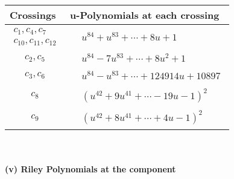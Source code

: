 \documentclass[1p]{elsarticle_modified}
\theoremstyle{definition}
\begin{document}
\begin{tabular}{m{50pt}|m{274pt}}
Crossings & \hspace{64pt}u-Polynomials at each crossing \\
\hline $$\begin{aligned}c_{1},c_{4},c_{7}\\c_{10},c_{11},c_{12}\end{aligned}$$&$\begin{aligned}
&u^{84}+u^{83}+\cdots+8 u+1
\end{aligned}$\\
\hline $$\begin{aligned}c_{2},c_{5}\end{aligned}$$&$\begin{aligned}
&u^{84}-7 u^{83}+\cdots+8 u^2+1
\end{aligned}$\\
\hline $$\begin{aligned}c_{3},c_{6}\end{aligned}$$&$\begin{aligned}
&u^{84}- u^{83}+\cdots+124914 u+10897
\end{aligned}$\\
\hline $$\begin{aligned}c_{8}\end{aligned}$$&$\begin{aligned}
&(u^{42}+9 u^{41}+\cdots-19 u-1)^{2}
\end{aligned}$\\
\hline $$\begin{aligned}c_{9}\end{aligned}$$&$\begin{aligned}
&(u^{42}+8 u^{41}+\cdots+4 u-1)^{2}
\end{aligned}$\\
\hline
\end{tabular}\\~\\
\newpage\renewcommand{\arraystretch}{1}
\flushleft \textbf{(v) Riley Polynomials at the component}\newline \\
\end{document}
